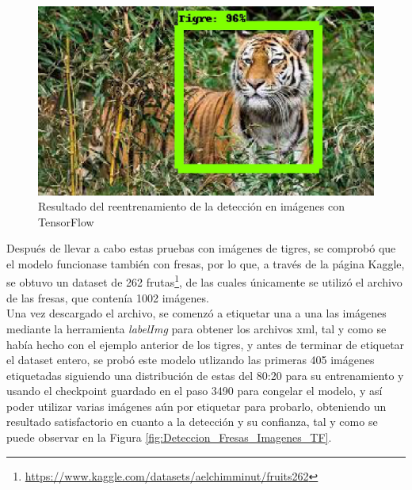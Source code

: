 \begin{figure}[H]
\begin{minipage}{0.46\textwidth}
  \end{minipage}
  \hspace{2mm}
  \begin{minipage}{0.46\textwidth}
    \centering
    \includegraphics[width=\linewidth]{figs/tigre_5_v2.jpeg}
  \end{minipage}
  \caption{Resultado del reentrenamiento de la detección en imágenes con TensorFlow}
  \label{fig:deteccion_tensorflow_tigres_v2}
  \end{figure}


Después de llevar a cabo estas pruebas con imágenes de tigres, se comprobó que el modelo funcionase también con fresas, por lo que, a través de la página Kaggle, se obtuvo un dataset de 262 frutas\footnote{\url{https://www.kaggle.com/datasets/aelchimminut/fruits262}}, de las cuales únicamente se utilizó el archivo de las fresas, que contenía 1002 imágenes.\\

Una vez descargado el archivo, se comenzó a etiquetar una a una las imágenes mediante la herramienta \textit{labelImg} para obtener los archivos xml, tal y como se había hecho con el ejemplo anterior de los tigres, y antes de terminar de etiquetar el dataset entero, se probó este modelo utlizando las primeras 405 imágenes etiquetadas siguiendo una distribución de estas del 80:20 para su entrenamiento y usando el checkpoint guardado en el paso 3490 para congelar el modelo, y así poder utilizar varias imágenes aún por etiquetar para probarlo, obteniendo un resultado satisfactorio en cuanto a la detección y su confianza, tal y como se puede observar en la Figura \ref{fig:Deteccion_Fresas_Imagenes_TF}.

